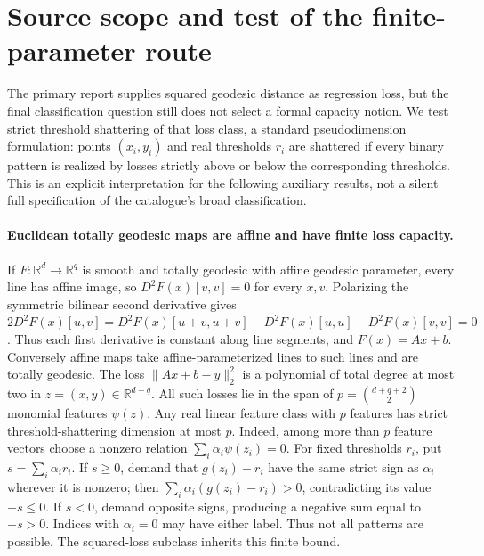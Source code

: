 \documentclass[11pt]{article}
\begin{document}
\section{Source scope and test of the finite-parameter route}
The primary report supplies squared geodesic distance as regression loss,
but the final classification question still does not select a formal capacity
notion. We test strict threshold shattering of that loss class, a standard
pseudodimension formulation: points $(x_i,y_i)$ and real thresholds $r_i$
are shattered if every binary pattern is realized by losses strictly above
or below the corresponding thresholds. This is an explicit interpretation
for the following auxiliary results, not a silent full specification of the
catalogue's broad classification.

\paragraph{Euclidean totally geodesic maps are affine and have finite loss capacity.}
If $F:\mathbb R^d\to\mathbb R^q$ is smooth and totally geodesic with
affine geodesic parameter, every line has affine image, so
$D^2F(x)[v,v]=0$ for every $x,v$. Polarizing the symmetric bilinear
second derivative gives
$2D^2F(x)[u,v]=D^2F(x)[u+v,u+v]-D^2F(x)[u,u]-D^2F(x)[v,v]=0$.
Thus each first derivative is constant along line segments, and
$F(x)=Ax+b$. Conversely affine maps take affine-parameterized lines to such
lines and are totally geodesic.
The loss $\|Ax+b-y\|_2^2$ is a polynomial of total degree at most two in
$z=(x,y)\in\mathbb R^{d+q}$. All such losses lie in the span of
$p=\binom{d+q+2}{2}$ monomial features $\psi(z)$.
Any real linear feature class with $p$ features has strict threshold-shattering
dimension at most $p$. Indeed, among more than $p$ feature vectors choose
a nonzero relation $\sum_i\alpha_i\psi(z_i)=0$. For fixed thresholds
$r_i$, put $s=\sum_i\alpha_i r_i$. If $s\ge0$, demand that
$g(z_i)-r_i$ have the same strict sign as $\alpha_i$ wherever it is nonzero;
then $\sum_i\alpha_i(g(z_i)-r_i)>0$, contradicting its value $-s\le0$.
If $s<0$, demand opposite signs, producing a negative sum equal to
$-s>0$. Indices with $\alpha_i=0$ may have either label. Thus not all
patterns are possible. The squared-loss subclass inherits this finite bound.
\end{document}
